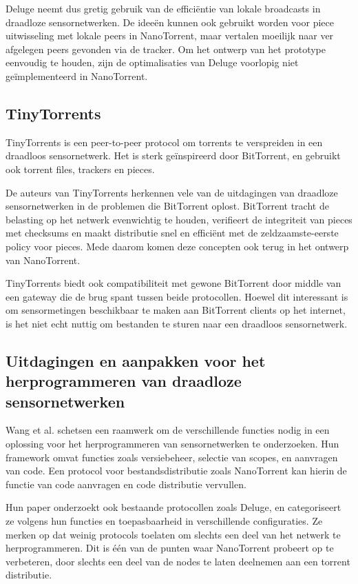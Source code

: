 \documentclass[journal]{IEEEtran}
\begin{document}
Deluge neemt dus gretig gebruik van de effici\"entie van lokale broadcasts in draadloze sensornetwerken. De idee\"en kunnen ook gebruikt worden voor piece uitwisseling met lokale peers in NanoTorrent, maar vertalen moeilijk naar ver afgelegen peers gevonden via de tracker. Om het ontwerp van het prototype eenvoudig te houden, zijn de optimalisaties van Deluge  voorlopig niet ge\"implementeerd in NanoTorrent.

\subsection{TinyTorrents}
TinyTorrents \cite{tinytorrents} is een peer-to-peer protocol om torrents te verspreiden in een draadloos sensornetwerk. Het is sterk ge\"inspireerd door BitTorrent, en gebruikt ook torrent files, trackers en pieces.

De auteurs van TinyTorrents herkennen vele van de uitdagingen van draadloze sensornetwerken in de problemen die BitTorrent oplost. BitTorrent tracht de belasting op het netwerk evenwichtig te houden, verifieert de integriteit van pieces met checksums en maakt distributie snel en effici\"ent met de zeldzaamste-eerste policy voor pieces. Mede daarom komen deze concepten ook terug in het ontwerp van NanoTorrent.

TinyTorrents biedt ook compatibiliteit met gewone BitTorrent door middle van een gateway die de brug spant tussen beide protocollen. Hoewel dit interessant is om sensormetingen beschikbaar te maken aan BitTorrent clients op het internet, is het niet echt nuttig om bestanden te sturen naar een draadloos sensornetwerk.

\subsection{Uitdagingen en aanpakken voor het herprogrammeren van draadloze sensornetwerken}
Wang et al. \cite{wang-reprogramming} schetsen een raamwerk om de verschillende functies nodig in een oplossing voor het herprogrammeren van sensornetwerken te onderzoeken. Hun framework omvat functies zoals versiebeheer, selectie van scopes, en aanvragen van code. Een protocol voor bestandsdistributie zoals NanoTorrent kan hierin de functie van code aanvragen en code distributie vervullen.

Hun paper onderzoekt ook bestaande protocollen zoals Deluge, en categoriseert ze volgens hun functies en toepasbaarheid in verschillende configuraties. Ze merken op dat weinig protocols toelaten om slechts een deel van het netwerk te herprogrammeren. Dit is \'e\'en van de punten waar NanoTorrent probeert op te verbeteren, door slechts een deel van de nodes te laten deelnemen aan een torrent distributie.
\end{document}
